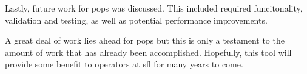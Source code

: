 Lastly, future work for \gls{pops} was discussed. This included required
funcitonality, validation and testing, as well as potential performance
improvements.


A great deal of work lies ahead for \gls{pops} but this is only a testament to
the amount of work that has already been accomplished. Hopefully, this tool
will provide some benefit to operators at \gls{sfl} for many years to
come.










